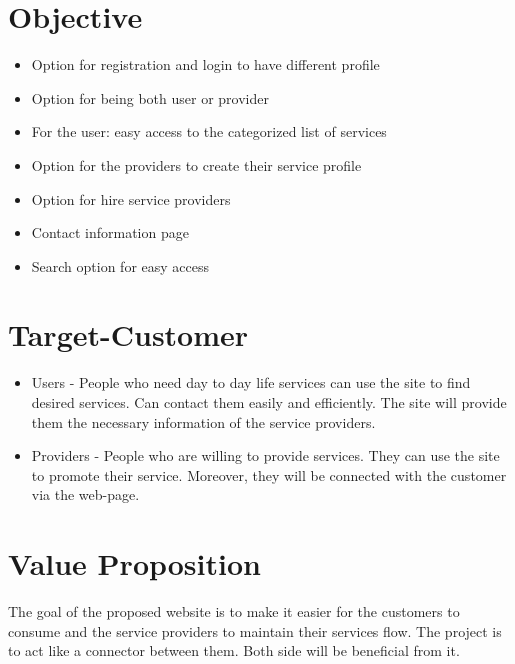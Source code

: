 \documentclass[14pt]{report}
\begin{document}
\section*{\LARGE  Objective}

\begin{Large}
\begin{itemize}
  \item Option for registration and login to have different profile
  \item Option for being both user or provider
  \item For the user: easy access to the categorized list of services
  \item Option for the providers to create their service profile
  \item Option for hire service providers
  \item Contact information page
  \item Search option for easy access
\end{itemize}
\end{Large}

\section*{\LARGE  Target-Customer}

\begin{Large}
\begin{itemize}
  \item Users - People who need day to day life services can use the site to find desired services. Can contact them easily and efficiently. The site will provide them the necessary information of the service providers.
  \item Providers - People who are willing to provide services. They can use the site to promote their service. Moreover, they will be connected with the customer via the web-page. 
\end{itemize}
\end{Large}

\section*{\LARGE Value Proposition}

\begin{Large}

The goal of the proposed website is to make it easier for the customers to consume and the service providers to maintain their services flow. The project is to act like a connector between them. Both side will be beneficial from it.

\end{Large}
\end{document}
